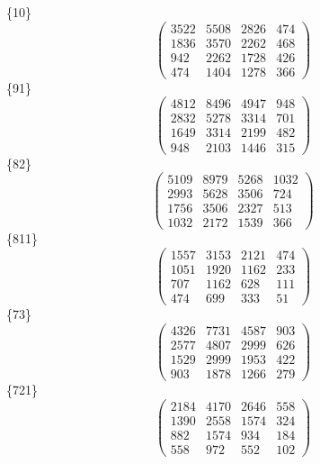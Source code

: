\documentclass[12pt,reqno]{amsart}
\begin{document}
\Large
\{10\}                             $$ \begin{pmatrix} 
                     3522 & 5508 & 2826 & 474 \\[6pt]
                     1836 & 3570 & 2262 & 468 \\[6pt]
                      942 & 2262 & 1728 & 426 \\[6pt]
                        474 & 1404 & 1278 & 366
                              \end{pmatrix} $$ 
\{91\}                             $$ \begin{pmatrix} 
                     4812 & 8496 & 4947 & 948 \\[6pt]
                     2832 & 5278 & 3314 & 701 \\[6pt]
                     1649 & 3314 & 2199 & 482 \\[6pt]
                        948 & 2103 & 1446 & 315
                              \end{pmatrix} $$ 
\{82\}                             $$ \begin{pmatrix} 
                     5109 & 8979 & 5268 & 1032 \\[6pt]
                     2993 & 5628 & 3506 & 724 \\[6pt]
                     1756 & 3506 & 2327 & 513 \\[6pt]
                       1032 & 2172 & 1539 & 366
                              \end{pmatrix} $$ 
\{811\}                             $$ \begin{pmatrix} 
                     1557 & 3153 & 2121 & 474 \\[6pt]
                     1051 & 1920 & 1162 & 233 \\[6pt]
                      707 & 1162 & 628 & 111 \\[6pt]
                         474 & 699 & 333 & 51
                              \end{pmatrix} $$ 
\{73\}                             $$ \begin{pmatrix} 
                     4326 & 7731 & 4587 & 903 \\[6pt]
                     2577 & 4807 & 2999 & 626 \\[6pt]
                     1529 & 2999 & 1953 & 422 \\[6pt]
                        903 & 1878 & 1266 & 279
                              \end{pmatrix} $$ 
\{721\}                             $$ \begin{pmatrix} 
                     2184 & 4170 & 2646 & 558 \\[6pt]
                     1390 & 2558 & 1574 & 324 \\[6pt]
                      882 & 1574 & 934 & 184 \\[6pt]
                         558 & 972 & 552 & 102
                              \end{pmatrix} $$ 
\end{document}
